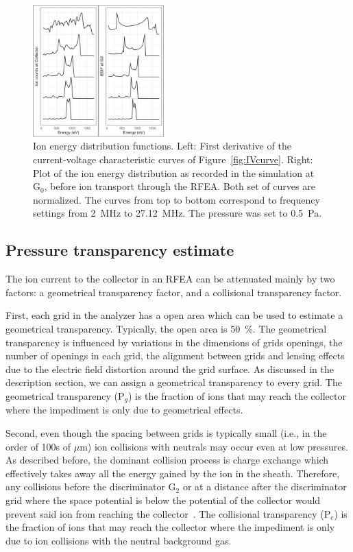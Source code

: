 \begin{figure}[htbp]
\centering
\includegraphics[width=0.45\textwidth]{Figures/FrequencyScan.jpeg}
\caption{Ion energy distribution functions. Left: First derivative of the current-voltage characteristic curves of Figure~\ref{fig:IVcurve}. Right: Plot of the ion energy distribution as recorded in the simulation at G$_0$, before ion transport through the RFEA. Both set of curves are normalized. The curves from top to bottom correspond to frequency settings from 2~MHz to 27.12~MHz. The pressure was set to 0.5~Pa.}
\label{fig:FrequencyScan}
\end{figure}




\subsection{Pressure transparency estimate}
The ion current to the collector in an RFEA can be attenuated mainly by two factors: a geometrical transparency factor, and a collisional transparency factor.  

First, each grid in the analyzer has a open area which can be used to estimate a geometrical transparency. Typically, the open area is 50~\%. The geometrical transparency is influenced by variations in the dimensions of grids openings, the number of openings in each grid, the alignment between grids and lensing effects due to the electric field distortion around the grid surface. As discussed in the description section, we can assign a geometrical transparency to every grid. The geometrical transparency (P$_g$) is the fraction of ions that may reach the collector where the impediment is only due to geometrical effects.  

Second, even though the spacing between grids is typically small (i.e., in the order of 100s of $\mu$m) ion collisions with neutrals may occur even at low pressures. As described before, the dominant collision process is charge exchange which effectively takes away all the energy gained by the ion in the sheath. Therefore, any collisions before the discriminator G$_2$ or at a distance after the discriminator grid where the space potential is below the potential of the collector would prevent said ion from reaching the collector~\cite{Baloniak2010}. The collisional transparency (P$_c$) is the fraction of ions that may reach the collector where the impediment is only due to ion collisions with the neutral background gas. 

